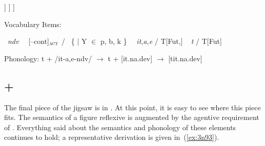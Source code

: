 \begin{exe}
\begin{xlist}
\begin{xlist}
\begin{exe}
\begin{xlist}
\begin{xlist}
\begin{exe}
\begin{xlist}
\begin{xlist}
\begin{exe}
\begin{exe}
\begin{xlist}
\begin{exe}
\begin{exe}
\begin{xlist}
\begin{exe}
\begin{exe}
\begin{exe}
\begin{exe}
\begin{exe}
\begin{xlist}
\begin{exe}
\begin{xlist}
\begin{exe}
\begin{exe}
\begin{xlist}
\begin{exe}
\begin{xlist}
\begin{exe}
\begin{exe}
\begin{exe}
\begin{xlist}
\begin{exe}
\begin{exe}
\begin{exe}
\begin{xlist}
\begin{exe}
\begin{xlist}
\begin{exe}
\begin{xlist}
\begin{exe}
\begin{xlist}
\begin{exe}
\begin{exe}
\begin{exe}
\begin{exe}
\begin{xlist}
\begin{exe}
\begin{xlist}
\begin{exe}
\begin{xlist}
\begin{exe}
\begin{xlist}
\begin{exe}
\begin{xlist}
\begin{exe}
\begin{xlist}
\begin{exe}
\begin{exe}
\begin{exe}
\begin{exe}
\begin{xlist}
\begin{exe}
\begin{xlist}
\begin{exe}
\begin{xlist}
\begin{exe}
\begin{exe}
\begin{xlist}
\begin{exe}
\begin{exe}
\begin{exe}
\begin{exe}
\begin{xlist}
\begin{xlist}
\begin{exe}
\begin{xlist}
\begin{exe}
\begin{exe}
\begin{exe}
\begin{xlist}
\begin{exe}
\begin{exe}
\begin{xlist}
\begin{exe}
\begin{exe}
\begin{exe}
\begin{xlist}
\begin{xlist}
\begin{exe}
\begin{xlist}
\begin{exe}
\begin{exe}
\begin{exe}
\begin{exe}
\begin{xlist}
\begin{exe}
\begin{xlist}
\begin{exe}
\begin{xlist}
\begin{exe}
\begin{exe}
\begin{exe}
\begin{exe}
\begin{exe}
\begin{exe}
\begin{xlist}
\begin{exe}
		]
        	]
        	]

 \ex \label{ex:titpane2}Vocabulary Items: 
 \begin{xlist} 
     \ex  {} \lra~\emph{ndv} 
     \ex  \va~\lra~[--cont]$_{\gsc{ACT}}$ / {\trace}~\{  $|$ Y $\in$ p, b, k \} 
     \ex  \vz~\lra~\emph{it},\emph{a,e} / T[Fut,] {\trace} \va 
      \lra~ \emph{t} / {\trace} T[Fut] 
 \z

\ex  Phonology: 
 	t + /it-a,e-ndv/ $\rightarrow$ t + [it.na.dev] $\rightarrow$ [tit.na.dev]
 \z 
    
	\subsection{{\va} + {\pz}} \label{vz:va:pzva}
The final piece of the jigsaw is  in {\thit}. At this point, it is easy to see where this piece fits. The semantics of a figure reflexive {\pz} is augmented by the agentive requirement of {\va}. Everything said about the semantics and phonology of these elements continues to hold; a representative derivation is given in~(\ref{ex:3n93}).

 \begin{exe}
 \ex  \label{ex:3n93}
 \begin{xlist} 
	
 	\ex  
 \z
\z 
\fittable{
\scalebox{0.8}{
\Tree
    [.{VoiceP\\ λe∃s.\underline{Agent(Bjartur,e)} \& \underline{Figure(Bjartur,s)} \& in(s,room) \& enter(e) \& Causer(e,s)}
       [.{DP\\\emph{bjartur}} ]
 }}
\end{xlist}
\end{exe}
\end{xlist}
\end{exe}
\end{xlist}
\end{exe}
\end{exe}
\end{exe}
\end{exe}
\end{exe}
\end{exe}
\end{xlist}
\end{exe}
\end{xlist}
\end{exe}
\end{xlist}
\end{exe}
\end{exe}
\end{exe}
\end{exe}
\end{xlist}
\end{exe}
\end{xlist}
\end{xlist}
\end{exe}
\end{exe}
\end{exe}
\end{xlist}
\end{exe}
\end{exe}
\end{xlist}
\end{exe}
\end{exe}
\end{exe}
\end{xlist}
\end{exe}
\end{xlist}
\end{xlist}
\end{exe}
\end{exe}
\end{exe}
\end{exe}
\end{xlist}
\end{exe}
\end{exe}
\end{xlist}
\end{exe}
\end{xlist}
\end{exe}
\end{xlist}
\end{exe}
\end{exe}
\end{exe}
\end{exe}
\end{xlist}
\end{exe}
\end{xlist}
\end{exe}
\end{xlist}
\end{exe}
\end{xlist}
\end{exe}
\end{xlist}
\end{exe}
\end{xlist}
\end{exe}
\end{exe}
\end{exe}
\end{exe}
\end{xlist}
\end{exe}
\end{xlist}
\end{exe}
\end{xlist}
\end{exe}
\end{xlist}
\end{exe}
\end{exe}
\end{exe}
\end{xlist}
\end{exe}
\end{exe}
\end{exe}
\end{xlist}
\end{exe}
\end{xlist}
\end{exe}
\end{exe}
\end{xlist}
\end{exe}
\end{xlist}
\end{exe}
\end{exe}
\end{exe}
\end{exe}
\end{exe}
\end{xlist}
\end{exe}
\end{exe}
\end{xlist}
\end{exe}
\end{exe}
\end{xlist}
\end{xlist}
\end{exe}
\end{xlist}
\end{xlist}
\end{exe}
\end{xlist}
\end{xlist}
\end{exe}
